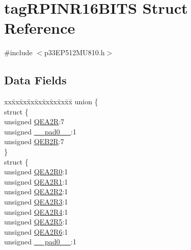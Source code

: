 \hypertarget{structtag_r_p_i_n_r16_b_i_t_s}{}\section{tag\+R\+P\+I\+N\+R16\+B\+I\+TS Struct Reference}
\label{structtag_r_p_i_n_r16_b_i_t_s}


{\ttfamily \#include $<$p33\+E\+P512\+M\+U810.\+h$>$}

\subsection*{Data Fields}
\begin{DoxyCompactItemize}
\item 
\begin{tabbing}
xx\=xx\=xx\=xx\=xx\=xx\=xx\=xx\=xx\=\kill
union \{\\
\>struct \{\\
\>\>unsigned \hyperlink{structtag_r_p_i_n_r16_b_i_t_s_ac915225963b969f86bc51215cd953062}{QEA2R}:7\\
\>\>unsigned \hyperlink{structtag_r_p_i_n_r16_b_i_t_s_adf71f3d8410c1f1dbbc96680a92c49af}{\_\_pad0\_\_}:1\\
\>\>unsigned \hyperlink{structtag_r_p_i_n_r16_b_i_t_s_a0d4bb9ea70c551a3cd4196ce630ef1dd}{QEB2R}:7\\
\>\} \\
\>struct \{\\
\>\>unsigned \hyperlink{structtag_r_p_i_n_r16_b_i_t_s_a95a34e31aadefe2192021cc5cd03aac3}{QEA2R0}:1\\
\>\>unsigned \hyperlink{structtag_r_p_i_n_r16_b_i_t_s_a2d0d3fe7e344396da5a36d94c89c740e}{QEA2R1}:1\\
\>\>unsigned \hyperlink{structtag_r_p_i_n_r16_b_i_t_s_a26475e3311a7375b288f2023e1f50922}{QEA2R2}:1\\
\>\>unsigned \hyperlink{structtag_r_p_i_n_r16_b_i_t_s_abb5114b792babb03c595243245c89659}{QEA2R3}:1\\
\>\>unsigned \hyperlink{structtag_r_p_i_n_r16_b_i_t_s_a8865a83045be0fcaaaf51ba74d89b4ec}{QEA2R4}:1\\
\>\>unsigned \hyperlink{structtag_r_p_i_n_r16_b_i_t_s_a7b6374f2c3f23742811c96394efdb6e3}{QEA2R5}:1\\
\>\>unsigned \hyperlink{structtag_r_p_i_n_r16_b_i_t_s_afcad75d132f4b02c2c98186285325be7}{QEA2R6}:1\\
\>\>unsigned \hyperlink{structtag_r_p_i_n_r16_b_i_t_s_adf71f3d8410c1f1dbbc96680a92c49af}{\_\_pad0\_\_}:1\\

\end{tabbing}
\end{DoxyCompactItemize}
